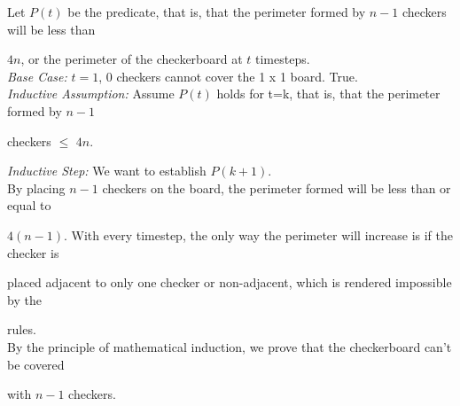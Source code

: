 \documentclass[11pt]{article}
\begin{document}
	Let $P(t)$ be the predicate, that is, that the perimeter formed by $n-1$ checkers will be less than 

	$4n$, or the perimeter of the checkerboard at $t$ timesteps.\\

	\textit{Base Case:} $t = 1$, 0 checkers cannot cover the 1 x 1 board. True. \\
	
	\textit{Inductive Assumption:} Assume $P(t)$ holds for t=k, that is, that the perimeter formed by $n-1$

	checkers $\leq$ $4n$.

	\newpage

	\textit{Inductive Step:} We want to establish $P(k+1)$. \\

	By placing $n-1$ checkers on the board, the perimeter formed will be less than or equal to 

	$4(n-1)$. With every timestep, the only way the perimeter will increase is if the checker is

	placed adjacent to only one checker or non-adjacent, which is rendered impossible by the

	rules. \\

	By the principle of mathematical induction, we prove that the checkerboard can't be covered

	with $n-1$ checkers. 
\end{document}
